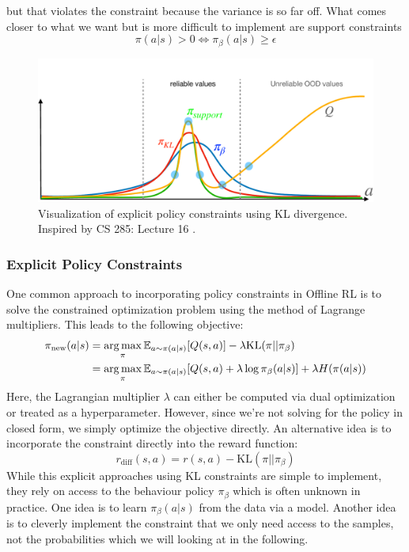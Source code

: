 but that violates the constraint because the variance is so far off.\newline 
What comes closer to what we want but is more difficult to implement are support constraints 
$$\pi(a|s) > 0 \iff \pi_\beta(a|s) \geq \epsilon $$
\begin{figure}[H]
    \centering
    \includegraphics[width=0.8\linewidth]{images/explicit_offline_rl.pdf}
    \caption{Visualization of explicit policy constraints using KL divergence. Inspired by CS 285: Lecture 16 \cite{CS285,CS285LevineYoutube}.}
    \label{out_of_support}
\end{figure}
\subsubsection{Explicit Policy Constraints}
One common approach to incorporating policy constraints in Offline RL is to solve the constrained optimization problem using 
the method of Lagrange multipliers. This leads to the following objective:
\begin{align*}
     \pi_\text{new}(a|s) &= \operatorname*{arg\,max}\limits_\pi \mathbb{E}_{a\sim \pi(a|s)}[Q(s,a)] - \lambda \text{KL}(\pi||\pi_\beta) \\
      &= \operatorname*{arg\,max}\limits_\pi \mathbb{E}_{a\sim \pi(a|s)}[Q(s,a)+\lambda \log{\pi_\beta(a|s)}] + \lambda H(\pi(a|s)) 
\end{align*}
Here, the Lagrangian multiplier $\lambda$ can either be computed via dual optimization or treated as a hyperparameter. 
However, since we're not solving for the policy in closed form, we simply optimize the objective directly. An alternative idea 
is to incorporate the constraint directly into the reward function:
$$r_\text{diff}(s,a) =r(s,a)- \text{KL}(\pi||\pi_\beta)$$
While this explicit approaches using KL constraints are simple to implement, they rely on access to the behaviour policy $\pi_\beta$ which is often unknown in practice. One idea is to learn $\pi_\beta(a|s)$ from the data via a model. Another idea is to cleverly implement the constraint that we only need access to the samples, not the probabilities which we will looking at in the following.

